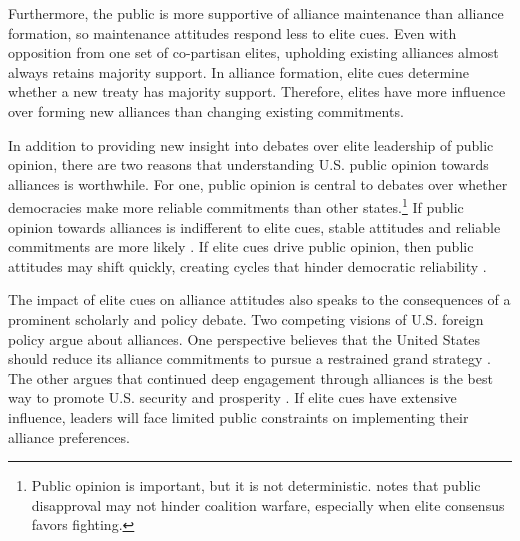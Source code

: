 \documentclass[12pt]{article}
\begin{document}
Furthermore, the public is more supportive of alliance maintenance than alliance formation, so maintenance attitudes respond less to elite cues. 
Even with opposition from one set of co-partisan elites, upholding existing alliances almost always retains majority support. 
In alliance formation, elite cues determine whether a new treaty has majority support. 
Therefore, elites have more influence over forming new alliances than changing existing commitments. 


In addition to providing new insight into debates over elite leadership of public opinion, there are two reasons that understanding U.S. public opinion towards alliances is worthwhile. 
For one, public opinion is central to debates over whether democracies make more reliable commitments than other states.\footnote{Public opinion is important, but it is not deterministic. \citet{Kreps2010} notes that public disapproval may not hinder coalition warfare, especially when elite consensus favors fighting.} 
If public opinion towards alliances is indifferent to elite cues, stable attitudes and reliable commitments are more likely \citep{Gaubatz1996}.
If elite cues drive public opinion, then public attitudes may shift quickly, creating cycles that hinder democratic reliability \citep{GartzkeGleditsch2004}.


The impact of elite cues on alliance attitudes also speaks to the consequences of a prominent scholarly and policy debate. 
Two competing visions of U.S. foreign policy argue about alliances. 
One perspective believes that the United States should reduce its alliance commitments to pursue a restrained grand strategy \citep{Preble2009, Posen2014}.
The other argues that continued deep engagement through alliances is the best way to promote U.S. security and prosperity \citep{Brooksetal2013, BrandsFeaver2017}. 
If elite cues have extensive influence, leaders will face limited public constraints on implementing their alliance preferences. 
\end{document}
